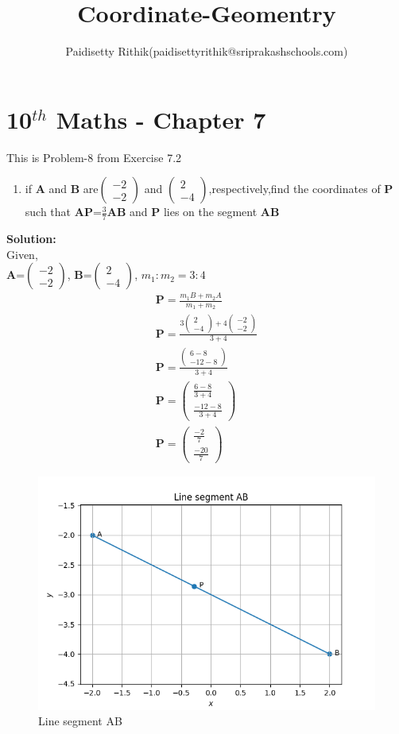 \documentclass[10pt]{article}
\title{Coordinate-Geomentry}
\author{Paidisetty Rithik(paidisettyrithik@sriprakashschools.com)}
\newcommand{\myvec}[1]{\ensuremath{\begin{pmatrix}#1\end{pmatrix}}}
\newcommand{\solution}{\noindent \textbf{Solution: }}
\let\vec\mathbf
\begin{document}
\maketitle
\section*{10$^{th}$ Maths - Chapter 7}
This is Problem-8 from Exercise 7.2
\begin{enumerate}
\item if $\vec{A}$ and $\vec{B}$ are\myvec{-2\\-2} and \myvec{2\\-4},respectively,find the coordinates of $\vec{P}$ such that $\vec{AP}$=$\frac{3}{7}\vec{AB}$ and $\vec{P}$ lies on the segment $\vec{AB}$ \\
\end{enumerate}
\solution \\
Given,\\
$\vec{A}$=\myvec{-2\\-2}, $\vec{B}$=\myvec{2\\-4},
$m_1:m_2=3:4$
\begin{align}
\vec{P}=\frac{m_1B+m_2A}{m_1+m_2}\\
\vec{P}=\frac{3\myvec{2\\-4}+4\myvec{-2\\-2}}{3+4}\\
\vec{P}=\frac{\myvec{6-8\\-12-8}}{3+4}\\
\vec{P}=\myvec{\frac{6-8}{3+4}\\\frac{-12-8}{3+4}}\\
\vec{P}=\myvec{\frac{-2}{7}\\\frac{-20}{7}}
\end{align}

\begin{figure}[H]
			\centering
			\includegraphics[width=\columnwidth]{figs/Figure_1.png}
			\caption{Line segment AB}
			\label{fig:4}
		\end{figure}
\end{document}
